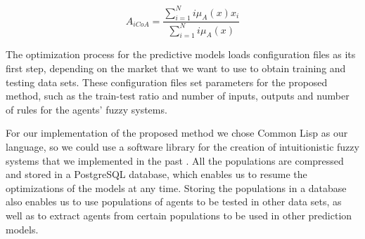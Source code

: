 \documentclass{ieeeaccess}
\begin{document}
\begin{equation}
  \label{equation:activation-score}
  A_{iCoA} = \dfrac{\sum_{i=1}^{N} i\mu_{A}(x) x_{i}}{\sum_{i=1}^{N}
    i\mu_{A}(x)}
\end{equation}

The optimization process for the predictive models loads configuration
files as its first step, depending on the market that we want to use
to obtain training and testing data sets. These configuration files
set parameters for the proposed method, such as the train-test ratio
and number of inputs, outputs and number of rules for the agents'
fuzzy systems.

For our implementation of the proposed method we chose Common Lisp as
our language, so we could use a software library for the creation of
intuitionistic fuzzy systems that we implemented in the past
\cite{Hernandez-Aguila2016} \cite{Hernandez-Aguila2017-2}. All the
populations are compressed and stored in a PostgreSQL database, which
enables us to resume the optimizations of the models at any
time. Storing the populations in a database also enables us to use
populations of agents to be tested in other data sets, as well as to
extract agents from certain populations to be used in other prediction
models.


\end{document}
